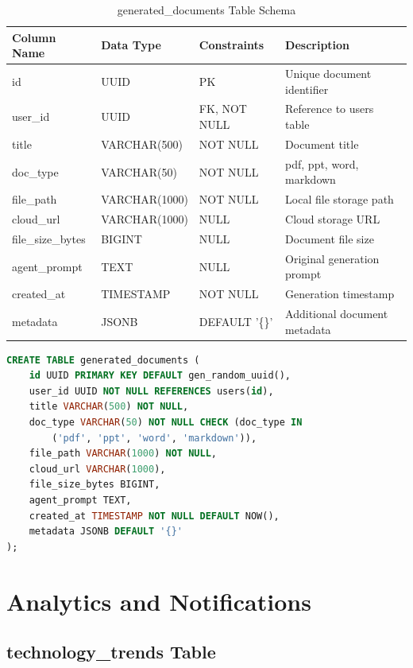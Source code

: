\documentclass[12pt,a4paper]{report}
\begin{document}
\begin{table}[h]
\centering
\small
\caption{generated\_documents Table Schema}
\begin{tabular}{|l|l|l|l|}
\toprule
\textbf{Column Name} & \textbf{Data Type} & \textbf{Constraints} & \textbf{Description} \\
\midrule
id & UUID & PK & Unique document identifier \\
user\_id & UUID & FK, NOT NULL & Reference to users table \\
title & VARCHAR(500) & NOT NULL & Document title \\
doc\_type & VARCHAR(50) & NOT NULL & pdf, ppt, word, markdown \\
file\_path & VARCHAR(1000) & NOT NULL & Local file storage path \\
cloud\_url & VARCHAR(1000) & NULL & Cloud storage URL \\
file\_size\_bytes & BIGINT & NULL & Document file size \\
agent\_prompt & TEXT & NULL & Original generation prompt \\
created\_at & TIMESTAMP & NOT NULL & Generation timestamp \\
metadata & JSONB & DEFAULT '\{\}' & Additional document metadata \\
\bottomrule
\end{tabular}
\end{table}

\begin{lstlisting}[language=SQL,basicstyle=\ttfamily\small]
CREATE TABLE generated_documents (
    id UUID PRIMARY KEY DEFAULT gen_random_uuid(),
    user_id UUID NOT NULL REFERENCES users(id),
    title VARCHAR(500) NOT NULL,
    doc_type VARCHAR(50) NOT NULL CHECK (doc_type IN 
        ('pdf', 'ppt', 'word', 'markdown')),
    file_path VARCHAR(1000) NOT NULL,
    cloud_url VARCHAR(1000),
    file_size_bytes BIGINT,
    agent_prompt TEXT,
    created_at TIMESTAMP NOT NULL DEFAULT NOW(),
    metadata JSONB DEFAULT '{}'
);
\end{lstlisting}

\newpage

\chapter{Analytics and Notifications}

\section{technology\_trends Table}
\end{document}
